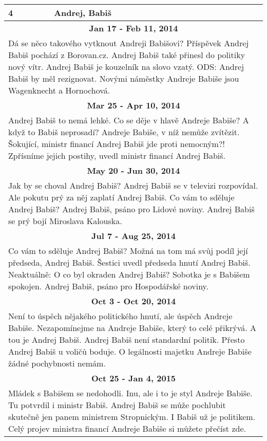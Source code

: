\begin{tabularx}{\linewidth}{l l}
\bf 4 & \bf Andrej, Babiš \\ \midrule
\multicolumn{2}{c}{\bf Jan 17 - Feb 11, 2014} \\
\multicolumn{2}{p{\linewidth}}{Dá se něco takového vytknout Andreji Babišovi? Příspěvek Andrej Babiš pochází z Borovan.cz. Andrej Babiš také přinesl do politiky nový vítr. Andrej Babiš je kouzelník na slovo vzatý. ODS: Andrej Babiš by měl rezignovat. Novými náměstky Andreje Babiše jsou Wagenknecht a Hornochová.} \\ \midrule
\multicolumn{2}{c}{\bf Mar 25 - Apr 10, 2014} \\
\multicolumn{2}{p{\linewidth}}{Andrej Babiš to nemá lehké. Co se děje v hlavě Andreje Babiše? A když to Babiš neprosadí? Andreje Babiše, v níž nemůže zvítězit. Šokující, ministr financí Andrej Babiš jde proti nemocným?! Zpřísníme jejich postihy, uvedl ministr financí Andrej Babiš.} \\ \midrule
\multicolumn{2}{c}{\bf May 20 - Jun 30, 2014} \\
\multicolumn{2}{p{\linewidth}}{Jak by se choval Andrej Babiš? Andrej Babiš se v televizi rozpovídal. Ale pokutu prý za něj zaplatí Andrej Babiš. Co vám to sděluje Andrej Babiš? Andrej Babiš, psáno pro Lidové noviny. Andrej Babiš se prý bojí Miroslava Kalouska.} \\ \midrule
\multicolumn{2}{c}{\bf Jul 7 - Aug 25, 2014} \\
\multicolumn{2}{p{\linewidth}}{Co vám to sděluje Andrej Babiš? Možná na tom má svůj podíl její předseda, Andrej Babiš. Šestici uvedl předseda hnutí Andrej Babiš. Neaktuálně: O co byl okraden Andrej Babiš? Sobotka je s Babišem spokojen. Andrej Babiš, psáno pro Hospodářské noviny.} \\ \midrule
\multicolumn{2}{c}{\bf Oct 3 - Oct 20, 2014} \\
\multicolumn{2}{p{\linewidth}}{Není to úspěch nějakého politického hnutí, ale úspěch Andreje Babiše. Nezapomínejme na Andreje Babiše, který to celé přikrývá. A tou je Andrej Babiš. Andrej Babiš není standardní politik. Přesto Andrej Babiš u voličů boduje. O legálnosti majetku Andreje Babiše žádné pochybnosti nemám.} \\ \midrule
\multicolumn{2}{c}{\bf Oct 25 - Jan 4, 2015} \\
\multicolumn{2}{p{\linewidth}}{Mládek s Babišem se nedohodli. Inu, ale i to je styl Andreje Babiše. Tu potvrdil i ministr Babiš. Andrej Babiš se může pochlubit skutečně jen panem ministrem Stropnickým. I Babiš už je politikem. Celý projev ministra financí Andreje Babiše si můžete přečíst zde.} \\ \midrule[1.5pt]


\end{tabularx}

